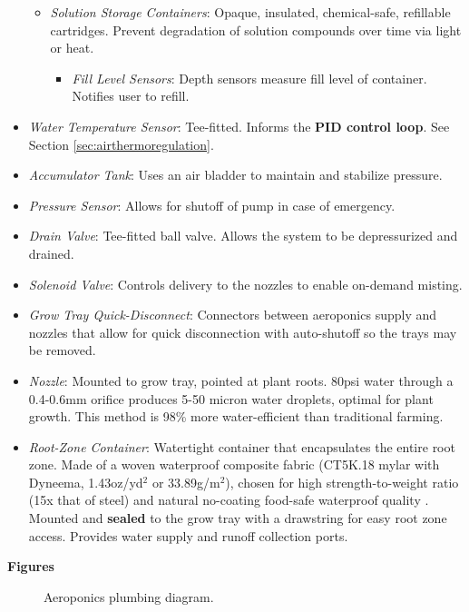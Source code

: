\begin{itemize}
\begin{itemize}
        \item \textit{Solution Storage Containers}: Opaque, insulated, chemical-safe, refillable cartridges. Prevent degradation of solution compounds over time via light or heat.
        \begin{itemize}
            \item \textit{Fill Level Sensors}: Depth sensors measure fill level of container. Notifies user to refill.
        \end{itemize}
    \end{itemize}
    \item \textit{Water Temperature Sensor}: Tee-fitted. Informs the \textbf{PID control loop}. See Section \ref{sec:airthermoregulation}.
    \item \textit{Accumulator Tank}: Uses an air bladder to maintain and stabilize pressure.
    \item \textit{Pressure Sensor}: Allows for shutoff of pump in case of emergency.
    \item \textit{Drain Valve}: Tee-fitted ball valve. Allows the system to be depressurized and drained.
    \item \textit{Solenoid Valve}: Controls delivery to the nozzles to enable on-demand misting.
    \item \textit{Grow Tray Quick-Disconnect}: Connectors between aeroponics supply and nozzles that allow for quick disconnection with auto-shutoff so the trays may be removed.
    \item \textit{Nozzle}: Mounted to grow tray, pointed at plant roots. 80psi water through a 0.4-0.6mm orifice produces 5-50 micron water droplets, optimal for plant growth. This method is 98\% more water-efficient than traditional farming.%
    \item \textit{Root-Zone Container}: Watertight container that encapsulates the entire root zone. Made of a woven waterproof composite fabric (CT5K.18 mylar with Dyneema, 1.43oz/yd${}^2$ or 33.89g/m${}^2$), chosen for high strength-to-weight ratio (15x that of steel) and natural no-coating food-safe waterproof quality \cite{dyneema}. Mounted and \textbf{sealed} to the grow tray with a drawstring for easy root zone access. Provides water supply and runoff collection ports.
\end{itemize}

\textbf{Figures}

\begin{figure}[h!]
    \centering
    \caption{Aeroponics plumbing diagram.}
    \label{fig:aeroponics_plumbing}
\end{figure}

